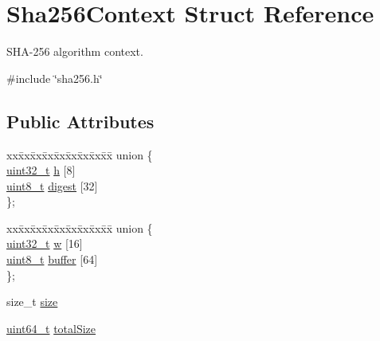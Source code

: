 \hypertarget{structSha256Context}{}\section{Sha256\+Context Struct Reference}
\label{structSha256Context}


S\+H\+A-\/256 algorithm context.  




{\ttfamily \#include \char`\"{}sha256.\+h\char`\"{}}

\subsection*{Public Attributes}
\begin{DoxyCompactItemize}
\item 
\begin{tabbing}
xx\=xx\=xx\=xx\=xx\=xx\=xx\=xx\=xx\=\kill
union \{\\
\>\hyperlink{stdint_8h_a435d1572bf3f880d55459d9805097f62}{uint32\_t} \hyperlink{structSha256Context_a47e82c75a2bffa21e47cd4f7dde0e01d}{h} \mbox{[}8\mbox{]}\\
\>\hyperlink{stdint_8h_aba7bc1797add20fe3efdf37ced1182c5}{uint8\_t} \hyperlink{structSha256Context_ab41942b2bb42e4a07e95c6e09e26b2f5}{digest} \mbox{[}32\mbox{]}\\
\}; \\

\end{tabbing}\item 
\begin{tabbing}
xx\=xx\=xx\=xx\=xx\=xx\=xx\=xx\=xx\=\kill
union \{\\
\>\hyperlink{stdint_8h_a435d1572bf3f880d55459d9805097f62}{uint32\_t} \hyperlink{structSha256Context_af557ee81cdcfdd3615776b9d7dafc1c6}{w} \mbox{[}16\mbox{]}\\
\>\hyperlink{stdint_8h_aba7bc1797add20fe3efdf37ced1182c5}{uint8\_t} \hyperlink{structSha256Context_a8f0a383e52f3ffd7f2e07473d0e755ba}{buffer} \mbox{[}64\mbox{]}\\
\}; \\

\end{tabbing}\item 
size\+\_\+t \hyperlink{structSha256Context_aa0dd1c73bffbc7dd5e0a3ca761a2b5a5}{size}
\item 
\hyperlink{stdint_8h_aec6fcb673ff035718c238c8c9d544c47}{uint64\+\_\+t} \hyperlink{structSha256Context_a1580160baa9a7ab6788054ce71f9e6af}{total\+Size}
\end{DoxyCompactItemize}


